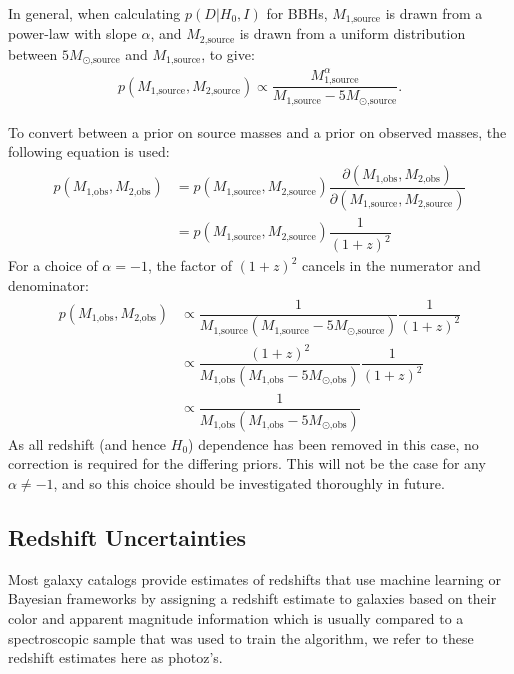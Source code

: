 \documentclass[a4paper,10pt]{article}
\begin{document}
In general, when calculating $p(D|H_0,I)$ for BBHs, $M_{\text{1,source}}$ is drawn from a power-law with slope $\alpha$, and $M_{\text{2,source}}$ is drawn from a uniform distribution between $5M_{\odot\text{,source}}$ and $M_{\text{1,source}}$, to give:
\begin{equation}
\begin{aligned}
p(M_{\text{1,source}},M_{\text{2,source}}) \propto \dfrac{M_{\text{1,source}}^\alpha}{M_{\text{1,source}}-5M_{\odot\text{,source}}}.
\end{aligned}
\end{equation}

To convert between a prior on source masses and a prior on observed masses, the following equation is used:
\begin{equation}
\begin{aligned}
p(M_{\text{1,obs}},M_{\text{2,obs}}) &= p(M_{\text{1,source}},M_{\text{2,source}}) \dfrac{\partial(M_{\text{1,obs}},M_{\text{2,obs}})}{\partial(M_{\text{1,source}},M_{\text{2,source}})}
\\ &= p(M_{\text{1,source}},M_{\text{2,source}}) \dfrac{1}{(1+z)^2}
\end{aligned}
\end{equation}
For a choice of $\alpha=-1$, the factor of $(1+z)^2$ cancels in the numerator and denominator:
\begin{equation}
\begin{aligned}
p(M_{\text{1,obs}},M_{\text{2,obs}}) &\propto \dfrac{1}{M_{\text{1,source}}(M_{\text{1,source}}-5M_{\odot\text{,source}})} \dfrac{1}{(1+z)^2}
\\ &\propto \dfrac{(1+z)^2}{M_{\text{1,obs}}(M_{\text{1,obs}}-5M_{\odot\text{,obs}})} \dfrac{1}{(1+z)^2}
\\ &\propto \dfrac{1}{M_{\text{1,obs}}(M_{\text{1,obs}}-5M_{\odot\text{,obs}})}
\end{aligned}
\end{equation}
As all redshift (and hence $H_0$) dependence has been removed in this case, no correction is required for the differing priors.  This will not be the case for any $\alpha \neq -1$, and so this choice should be investigated thoroughly in future.


\subsection{Redshift Uncertainties \label{Sec:redshift uncertainties}}
Most galaxy catalogs provide estimates of redshifts that use machine learning or Bayesian frameworks by assigning a redshift estimate to galaxies based on their color and apparent magnitude information which is usually compared to a spectroscopic sample that was used to train the algorithm, we refer to these redshift estimates here as photoz's.
\end{document}
